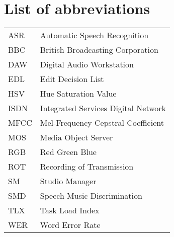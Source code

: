 \chapter*{List of abbreviations}

\begin{tabular}{l l}
ASR & Automatic Speech Recognition \\
BBC & British Broadcasting Corporation \\
DAW & Digital Audio Workstation \\
EDL & Edit Decision List \\
HSV & Hue Saturation Value \\
ISDN & Integrated Services Digital Network \\
MFCC & Mel-Frequency Cepstral Coefficient \\
MOS & Media Object Server \\
RGB & Red Green Blue \\
ROT & Recording of Transmission \\
SM  & Studio Manager \\
SMD & Speech Music Discrimination \\
TLX & Task Load Index \\
WER & Word Error Rate
\end{tabular}
